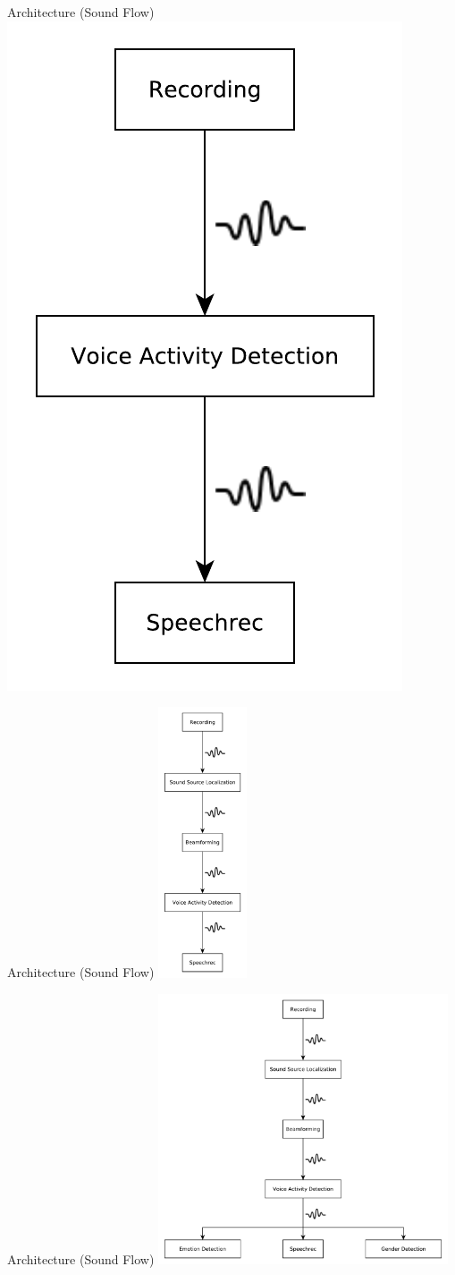 \documentclass{beamer}
\begin{document}
	\begin{frame}{Architecture (Sound Flow)}
		\centering
		\includegraphics[width=.40\textwidth]{Bilder/audio_flow}
	\end{frame}
	
	\begin{frame}{Architecture (Sound Flow)}
		\centering
		\includegraphics[height=8cm]{Bilder/audio_flow_1}
	\end{frame}
	
	\begin{frame}{Architecture (Sound Flow)}
		\centering
		\includegraphics[height=8cm]{Bilder/audio_flow_2}
	\end{frame}
	
\end{document}
